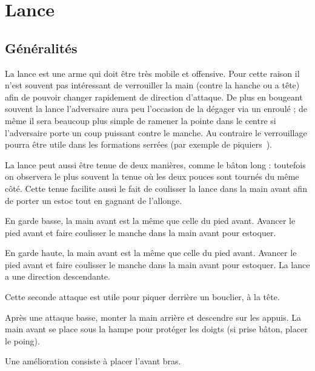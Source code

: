 \chapter{Lance}


\section{Généralités}

La lance est une arme qui doit être très mobile et offensive.
Pour cette raison il n'est souvent pas intéressant de verrouiller la main (contre la hanche ou a tête) afin de pouvoir changer rapidement de direction d'attaque.
De plus en bougeant souvent la lance l'adversaire aura peu l'occasion de la dégager via un enroulé ; de même il sera beaucoup plus simple de ramener la pointe dans le centre si l'adversaire porte un coup puissant contre le manche.
Au contraire le verrouillage pourra être utile dans les formations serrées (par exemple de piquiers~\footnotemark).

La lance peut aussi être tenue de deux manières, comme le bâton long : toutefois on observera le plus souvent la tenue où les deux pouces sont tournés du même côté.
Cette tenue facilite aussi le fait de coulisser la lance dans la main avant afin de porter un estoc tout en gagnant de l'allonge.


\begin{coup}
En garde basse, la main avant est la même que celle du pied avant.
Avancer le pied avant et faire coulisser le manche dans la main avant pour estoquer.
\end{coup}


\begin{coup}
En garde haute, la main avant est la même que celle du pied avant.
Avancer le pied avant et faire coulisser le manche dans la main avant pour estoquer.
La lance a une direction descendante.
\end{coup}

Cette seconde attaque est utile pour piquer derrière un bouclier, à la tête.

\begin{technique}
Après une attaque basse, monter la main arrière et descendre sur les appuis.
La main avant se place sous la hampe pour protéger les doigts (si prise bâton, placer le poing).

Une amélioration consiste à placer l'avant bras.
\end{technique}

